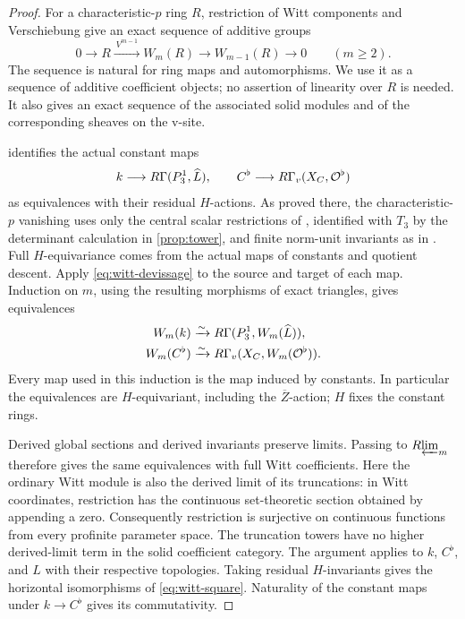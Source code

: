 \begin{proof}
For a characteristic-$p$ ring $R$, restriction of Witt components and
Verschiebung give an exact sequence of additive groups
\begin{equation}\label{eq:witt-devissage}
 0\longrightarrow R\xrightarrow{\ V^{m-1}\ }W_m(R)
   \longrightarrow W_{m-1}(R)\longrightarrow0
 \qquad(m\geq2).
\end{equation}
The sequence is natural for ring maps and automorphisms.  We use it as
a sequence of additive coefficient objects; no assertion of linearity
over $R$ is needed.  It also gives an exact sequence of the associated
solid modules and of the corresponding sheaves on the v-site.

 identifies the actual constant maps
\[
 k\longrightarrow R\Gamma(P_3^1,\widehat L),\qquad
 C^\flat\longrightarrow R\Gamma_v(X_C,\mathcal O^\flat)
\]
as equivalences with their residual $H$-actions.  As proved there,
the characteristic-$p$ vanishing uses only the central scalar
restrictions of \cite[Propositions~3.5.6 and~3.6.9]{BMR2026}, identified
with $T_3$ by the determinant calculation in \cref{prop:tower}, and finite
norm-unit
invariants as in \cite[Lemma~5.2.5]{BMR2026}.  Full $H$-equivariance
comes from the actual maps of constants and quotient descent.
Apply \eqref{eq:witt-devissage} to the source and target of each map.
Induction on $m$, using the resulting morphisms of exact triangles,
gives equivalences
\begin{align*}
 W_m(k)&\xrightarrow{\sim}
       R\Gamma(P_3^1,W_m(\widehat L)),\\
 W_m(C^\flat)&\xrightarrow{\sim}
       R\Gamma_v(X_C,W_m(\mathcal O^\flat)).
\end{align*}
Every map used in this induction is the map induced by constants.
In particular the equivalences are $H$-equivariant, including the
$\overline Z$-action; $H$ fixes the constant rings.

Derived global sections and derived invariants preserve limits.
Passing to $R\!\varprojlim_m$ therefore gives the same equivalences with full
Witt coefficients.  Here the ordinary Witt module is also the derived
limit of its truncations: in Witt coordinates, restriction has the
continuous set-theoretic section obtained by appending a zero.
Consequently restriction is surjective on continuous functions from
every profinite parameter space.  The truncation towers have no higher
derived-limit term in the solid coefficient category.  The argument
applies to $k$, $C^\flat$, and $\widehat L$ with their respective
topologies.  Taking residual $H$-invariants gives the horizontal
isomorphisms of \eqref{eq:witt-square}.  Naturality of the constant
maps under $k\to C^\flat$ gives its commutativity.


\end{proof}
